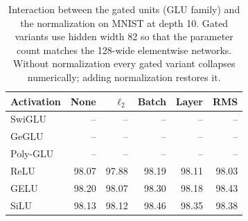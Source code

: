 \begin{table}[t]
\centering
\caption{Interaction between the gated units (GLU family) and the normalization on MNIST at depth 10. Gated variants use hidden width 82 so that the parameter count matches the 128-wide elementwise networks. Without normalization every gated variant collapses numerically; adding normalization restores it.}
\label{tab:glunorm}
\small
\begin{tabular}{lrrrrr}
\toprule
Activation & None & $\ell_2$ & Batch & Layer & RMS \\
\midrule
SwiGLU & -- & -- & -- & -- & -- \\
GeGLU & -- & -- & -- & -- & -- \\
Poly-GLU & -- & -- & -- & -- & -- \\
ReLU & 98.07 & 97.88 & 98.19 & 98.11 & 98.03 \\
GELU & 98.20 & 98.07 & 98.30 & 98.18 & 98.43 \\
SiLU & 98.13 & 98.12 & 98.46 & 98.35 & 98.38 \\
\bottomrule
\end{tabular}
\end{table}